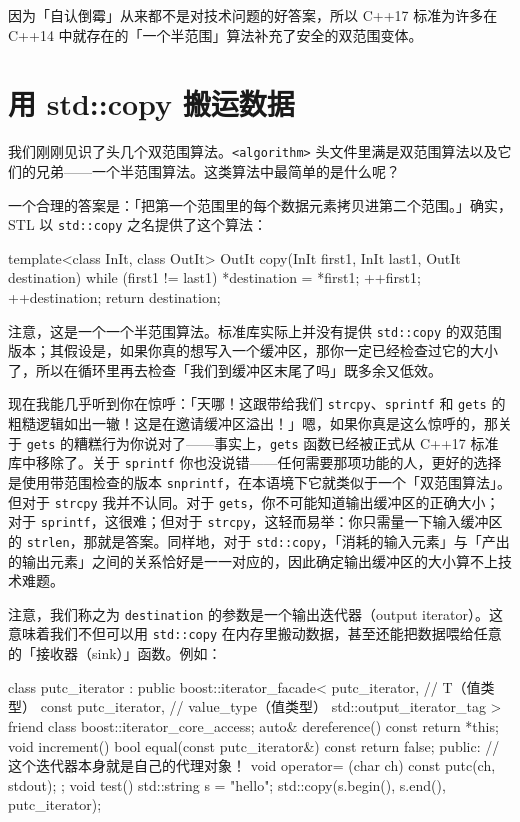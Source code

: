 因为「自认倒霉」从来都不是对技术问题的好答案，所以 C++17 标准为许多在 C++14 中就存在的「一个半范围」算法补充了安全的双范围变体。

\section{用 std::copy 搬运数据}

我们刚刚见识了头几个双范围算法。\texttt{<algorithm>\allowbreak{}} 头文件里满是双范围算法以及它们的兄弟——一个半范围算法。这类算法中最简单的是什么呢？

一个合理的答案是：「把第一个范围里的每个数据元素拷贝进第二个范围。」确实，STL 以 \texttt{std::\allowbreak{}copy} 之名提供了这个算法：

\begin{codebox}[cpp]
    template<class InIt, class OutIt>
    OutIt copy(InIt first1, InIt last1, OutIt destination)
    {
      while (first1 != last1) {
        *destination = *first1;
        ++first1;
        ++destination;
      }
      return destination;
    }
\end{codebox}

注意，这是一个一个半范围算法。标准库实际上并没有提供 \texttt{std::\allowbreak{}copy} 的双范围版本；其假设是，如果你真的想写入一个缓冲区，那你一定已经检查过它的大小了，所以在循环里再去检查「我们到缓冲区末尾了吗」既多余又低效。

现在我能几乎听到你在惊呼：「天哪！这跟带给我们 \texttt{strcpy}、\texttt{sprintf} 和 \texttt{gets} 的粗糙逻辑如出一辙！这是在邀请缓冲区溢出！」嗯，如果你真是这么惊呼的，那关于 \texttt{gets} 的糟糕行为你说对了——事实上，\texttt{gets} 函数已经被正式从 C++17 标准库中移除了。关于 \texttt{sprintf} 你也没说错——任何需要那项功能的人，更好的选择是使用带范围检查的版本 \texttt{snprintf}，在本语境下它就类似于一个「双范围算法」。但对于 \texttt{strcpy} 我并不认同。对于 \texttt{gets}，你不可能知道输出缓冲区的正确大小；对于 \texttt{sprintf}，这很难；但对于 \texttt{strcpy}，这轻而易举：你只需量一下输入缓冲区的 \texttt{strlen}，那就是答案。同样地，对于 \texttt{std::\allowbreak{}copy}，「消耗的输入元素」与「产出的输出元素」之间的关系恰好是一一对应的，因此确定输出缓冲区的大小算不上技术难题。

注意，我们称之为 \texttt{destination} 的参数是一个输出迭代器（output iterator）。这意味着我们不但可以用 \texttt{std::\allowbreak{}copy} 在内存里搬动数据，甚至还能把数据喂给任意的「接收器（sink）」函数。例如：

\begin{codebox}[cpp]
    class putc_iterator : public boost::iterator_facade<
      putc_iterator, // T（值类型）
      const putc_iterator, // value_type（值类型）
      std::output_iterator_tag
      >
    {
      friend class boost::iterator_core_access;
       auto& dereference() const { return *this; }
       void increment() {}
       bool equal(const putc_iterator&) const { return false; }
       public:
       // 这个迭代器本身就是自己的代理对象！
       void operator= (char ch) const { putc(ch, stdout); }
    };
    void test()
    {
      std::string s = "hello";
      std::copy(s.begin(), s.end(), putc_iterator{});
    }
\end{codebox}

